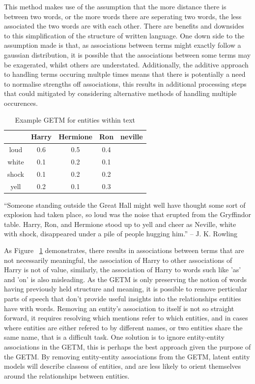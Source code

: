 \documentclass[10pt]{report}
\begin{document}
This method makes use of the assumption that the more distance there is between two words, or the more words there are seperating two words, the less associated the two words are with each other. There are benefits and downsides to this simplification of the structure of written language. One down side to the assumption made is that, as associations between terms might exactly follow a gaussian distribution, it is possible that the associations between some terms may be exagerated, whilst others are understated. Additionally, the additive approach to handling terms occuring multple times means that there is potentially a need to normalise strengths off associations, this results in additional processing steps that could mitigated by considering alternative methods of handling multiple occurences.


\begin{table}[h!]
  \centering
    \begin{tabular}{c | c c c c}
     &Harry&Hermione&Ron&neville\\
      \hline
      loud    & 0.6 & 0.5  & 0.4  & \\
      white   & 0.1 & 0.2  & 0.1  & \\
      shock   & 0.1 & 0.2  & 0.2  & \\
      yell    & 0.2 & 0.1  & 0.3  & \\  
    \end{tabular}
  \begin{displayquote}
 ``Someone standing outside the Great Hall might well have thought some
sort of explosion had taken place, so loud was the noise that erupted
from the Gryffindor table. Harry, Ron, and Hermione stood up to yell and
cheer as Neville, white with shock, disappeared under a pile of people
hugging him.'' -- J. K. Rowling
    \end{displayquote}
  \caption{ Example GETM for entities within text \label{fig:getm_example}}
\end{table}

As Figure ~\ref{fig:getm_example} demonstrates, there results in associations between terms that are not necessarily meaningful, the association of Harry to other associations of Harry is not of value, similarly, the association of Harry to words such like 'as' and 'on' is also misleading. As the GETM is only preserving the notion of words having previously held structure and meaning, it is possible to remove perticular parts of speech that don't provide useful insights into the relationships entities have with words. Removing an entity's association to itself is not so straight forward, it requires resolving which mentions refer to which entities, and in cases where entities are either refered to by different names, or two entities share the same name, that is a difficult task. One solution is to ignore entity-entity associations in the GETM, this is perhaps the best approach given the purpose of the GETM. By removing entity-entity associations from the GETM, latent entity models will describe classess of entities, and are less likely to orient themselves around the relationships between entities.
\end{document}
